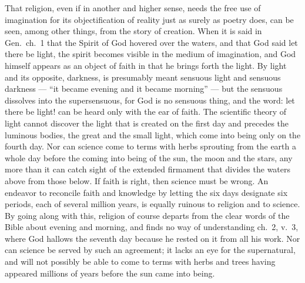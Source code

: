 \documentclass[12pt,a4paper]{article}
\begin{document}
That religion, even if in another and higher sense, needs the free use
of imagination for its objectification of reality just as surely as
poetry does, can be seen, among other things, from the story of
creation. When it is said in Gen.\ ch.\ 1 that the Spirit of God
hovered over the waters, and that God said let there be light, the
spirit becomes visible in the medium of imagination, and God himself
appears as an object of faith in that he brings forth the light. By
light and its opposite, darkness, is presumably meant sensuous light and
sensuous darkness --- ``it became evening and it became morning'' ---
but the sensuous dissolves into the supersensuous, for God is no
sensuous thing, and the word: let there be light! can be heard only
with the ear of faith. The scientific theory of light cannot discover
the light that is created on the first day and precedes the luminous
bodies, the great and the small light, which come into being only on
the fourth day. Nor can science come to terms with herbs sprouting
from the earth a whole day before the coming into being of the sun, the
moon and the stars, any more than it can catch sight of the extended
firmament that divides the waters above from those below. If faith is
right, then science must be wrong. An endeavor to reconcile faith and
knowledge by letting the six days designate six periods, each of
several million years, is equally ruinous to religion and to science.
By going along with this, religion of course departs from the clear
words of the Bible about evening and morning, and finds no way of
understanding ch.\ 2, v.\ 3, where God hallows the seventh day because
he rested on it from all his work. Nor can science be served by such an
agreement; it lacks an eye for the supernatural, and will not possibly
be able to come to terms with herbs and trees having appeared millions
of years before the sun came into being.
\end{document}
